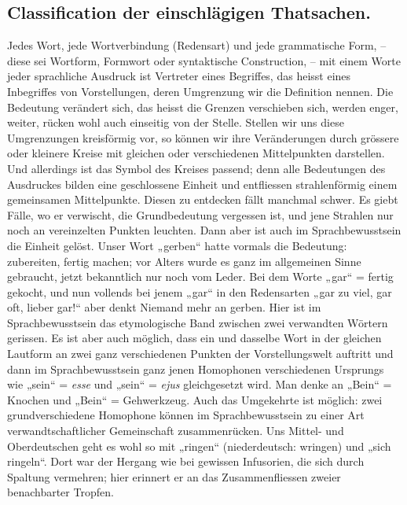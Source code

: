 {\subsection*{Classification der einschlägigen Thatsachen.}
Jedes Wort, jede Wortverbindung (Redensart) und jede grammatische Form, – diese sei Wortform, Formwort oder syntaktische Construction, – mit einem Worte jeder sprachliche Ausdruck ist Vertreter eines Begriffes, das heisst eines Inbegriffes von Vorstellungen, deren Umgrenzung wir die Definition nennen. Die Bedeutung verändert sich, das heisst die Grenzen verschieben sich, werden enger, weiter, rücken wohl auch einseitig von der Stelle. Stellen wir uns diese Umgrenzungen kreisförmig vor, so können wir ihre Veränderungen durch grössere oder kleinere Kreise mit gleichen oder verschiedenen Mittelpunkten darstellen. \label{fp.227} Und allerdings ist das Symbol des Kreises passend; denn alle Bedeutungen des Ausdruckes bilden eine geschlossene Einheit und entfliessen strahlenförmig einem gemeinsamen Mittelpunkte. Diesen zu entdecken fällt manchmal schwer. Es giebt Fälle, wo er verwischt, die Grundbedeutung vergessen ist, und jene Strahlen nur noch an vereinzelten Punkten leuchten. Dann aber ist auch im Sprachbewusstsein die Einheit gelöst. Unser Wort „gerben“ hatte vormals die Bedeutung: zubereiten, fertig machen; vor Alters wurde es ganz im allgemeinen Sinne gebraucht, jetzt bekanntlich nur noch vom Leder. Bei dem Worte „gar“ = fertig gekocht, und nun vollends bei jenem „gar“ in den Redensarten „gar zu viel, gar oft, lieber gar!“ aber denkt Niemand mehr an gerben. Hier ist im Sprachbewusstsein das etymologische Band zwischen zwei verwandten Wörtern gerissen. Es ist aber auch möglich, dass ein und dasselbe Wort in der gleichen Lautform an zwei ganz verschiedenen Punkten der Vorstellungswelt auftritt und dann im Sprachbewusstsein ganz jenen Homophonen verschiedenen Ursprungs wie „sein“ = \textit{esse} und „sein“ = \textit{ejus} gleichgesetzt wird. Man denke an „Bein“ = Knochen und „Bein“ = Gehwerkzeug. Auch das Umgekehrte ist möglich: zwei grundverschiedene Homophone können im Sprachbewusstsein zu einer Art verwandtschaftlicher Gemeinschaft zusammenrücken. Uns Mittel- und Oberdeutschen geht es wohl so mit „ringen“ (niederdeutsch: wringen) und „sich ringeln“. Dort war der Hergang wie bei gewissen \label{sp.230} Infusorien, die sich durch Spaltung vermehren; hier erinnert er an das Zusammenfliessen zweier benachbarter Tropfen.

}
